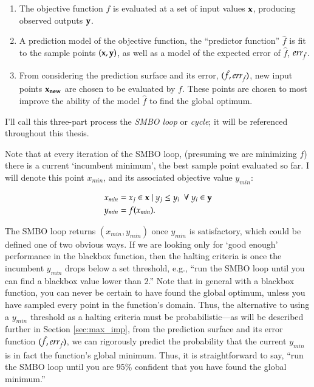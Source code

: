 \begin{minipage}{\textwidth}
\begin{framed}

\begin{enumerate} 
\item The objective function $f$ is evaluated at a set of input values $\mathbf{x}$, producing observed outputs $\mathbf{y}$.
\item A prediction model of the objective function, the ``predictor function'' $\hat{f}$ is fit to the sample points $(\mathbf{x},\mathbf{y})$, as well as a model of the expected error of $\hat{f}$, $err_{\hat{f}}$.
\item From considering the prediction surface and its error, $(\hat{f},err_{\hat{f}})$, new input points $\mathbf{x_{new}}$ are chosen to be evaluated by $f$. These points are chosen to most improve the ability of the model $\hat{f}$ to find the global optimum.\end{enumerate}
\end{framed}

\label{fig:smbo_loop}
\end{minipage}
I'll call this three-part process the \emph{SMBO loop} or \emph{cycle}; it will be referenced throughout this thesis. 

Note that at every iteration of the SMBO loop, (presuming we are minimizing $f$) there is a current `incumbent minimum', the best sample point evaluated so far. I will denote this point $x_{min}$, and its associated objective value $y_{min}$:

\begin{align} \label{x_min}
x_{min} &= x_j \in \mathbf{x}\ |\ y_j \leq y_i\ \ \forall\ y_i \in \mathbf{y}\\
y_{min} &= f(x_{min}).
\end{align}

The SMBO loop returns $(x_{min},y_{min})$ once $y_{min}$ is satisfactory, which could be defined one of two obvious ways. If we are looking only for `good enough' performance in the blackbox function, then the halting criteria is once the incumbent $y_{min}$ drops below a set threshold, e.g., ``run the SMBO loop until you can find a blackbox value lower than $2$.'' Note that in general with a blackbox function, you can never be certain to have found the global optimum, unless you have sampled every point in the function's domain. Thus, the alternative to using a $y_{min}$ threshold as a halting criteria must be probabilistic---as will be described further in Section \ref{sec:max_imp}, from the prediction surface and its error function $(\hat{f},err_{\hat{f}})$, we can rigorously predict the probability that the current $y_{min}$ is in fact the function's global minimum. Thus, it is straightforward to say, ``run the SMBO loop until you are 95\% confident that you have found the global minimum.''


